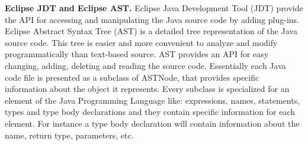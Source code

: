 \textbf{Eclipse JDT and Eclipse AST.} Eclipse Java Development Tool (JDT) \cite{jdt} provide the API for accessing and manipulating the Java source code by adding plug-ins. Eclipse Abstract Syntax Tree (AST) \cite{ast} is a detailed tree representation of the Java source code. This tree is easier and more convenient to analyze and modify programmatically than text-based source. AST provides an API for easy changing, adding, deleting and reading the source code. Essentially each Java code file is presented as a subclass of ASTNode, that provides specific information about the object it represents. Every subclass is specialized for an element of the Java Programming Language like: expressions, names, statements, types and type body declarations and they contain specific information for each element. For instance a type body declaration will contain information about the name, return type, parameters, etc.

